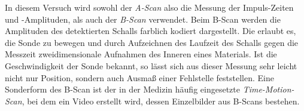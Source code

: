 In diesem Versuch wird sowohl der \textit{A-Scan} also die Messung der Impuls-Zeiten und -Amplituden, als auch der \textit{B-Scan} verwendet. Beim B-Scan werden die Amplituden des detektierten Schalls farblich kodiert dargestellt. Die erlaubt es, die Sonde zu bewegen und durch Aufzeichnen des Laufzeit des Schalls gegen die Messzeit zweidimensionale Aufnahmen des Inneren eines Materials. Ist die Geschwindigkeit der Sonde bekannt, so lässt sich aus dieser Messung sehr leicht nicht nur Position, sondern auch Ausmaß einer Fehlstelle feststellen.
Eine Sonderform des B-Scan ist der in der Medizin häufig eingesetzte \textit{Time-Motion-Scan}, bei dem ein Video erstellt wird, dessen Einzelbilder aus B-Scans bestehen.
